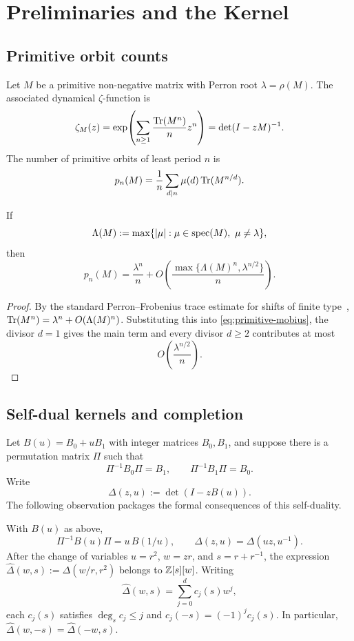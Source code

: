 \section{Preliminaries and the Kernel}\label{sec:preliminaries}


\subsection{Primitive orbit counts}

Let \(M\) be a primitive non-negative matrix with Perron root
\(\lambda=\rho(M)\). The associated dynamical \(\zeta\)-function is
\[
  \zeta_M(z)
  =\exp\!\left(\sum_{n\ge 1}\frac{\operatorname{Tr}(M^n)}{n}z^n\right)
  =\det(I-zM)^{-1}.
\]
The number of primitive orbits of least period \(n\) is
\begin{equation}\label{eq:primitive-mobius}
  p_n(M)=\frac{1}{n}\sum_{d\mid n}\mu(d)\operatorname{Tr}(M^{n/d}).
\end{equation}

\begin{lemma}\label{lem:primitive-orbit-asymptotic}
If
\[
  \Lambda(M):=\max\{|\mu|:\mu\in\spec(M),\ \mu\neq\lambda\},
\]
then
\[
  p_n(M)=\frac{\lambda^n}{n}
  +O\!\left(\frac{\max\{\Lambda(M)^n,\lambda^{n/2}\}}{n}\right).
\]
\end{lemma}

\begin{proof}
By the standard Perron--Frobenius trace estimate for shifts of finite
type~\cite{LindMarcus2021,Kitchens1998},
\(
  \operatorname{Tr}(M^n)=\lambda^n+O(\Lambda(M)^n)
\).
Substituting this into \eqref{eq:primitive-mobius}, the divisor \(d=1\)
gives the main term and every divisor \(d\ge 2\) contributes at most
\[
  O\!\left(\frac{\lambda^{n/2}}{n}\right).
\]
\end{proof}

\subsection{Self-dual kernels and completion}


Let \(B(u)=B_0+uB_1\) with integer matrices \(B_0,B_1\), and suppose there is a permutation matrix \(\Pi\) such that
\[
  \Pi^{-1}B_0\Pi=B_1,
  \qquad
  \Pi^{-1}B_1\Pi=B_0.
\]
Write
\[\Delta(z,u):=\det(I-zB(u)).\]
The following observation packages the formal consequences of this self-duality.

\begin{lemma}\label{lem:self-dual-compression}
With \(B(u)\) as above,
\[
  \Pi^{-1}B(u)\Pi=u\,B(1/u),
  \qquad
  \Delta(z,u)=\Delta(uz,u^{-1}).
\]
After the change of variables \(u=r^2\), \(w=zr\), and
\(s=r+r^{-1}\), the expression
\(\widehat\Delta(w,s):=\Delta(w/r,r^2)\) belongs to \(\mathbb{Z}[s][w]\).
Writing
\[
  \widehat\Delta(w,s)=\sum_{j=0}^d c_j(s)w^j,
\]
each \(c_j(s)\) satisfies \(\deg_s c_j\le j\) and
\(c_j(-s)=(-1)^j c_j(s)\). In particular,
\(\widehat\Delta(w,-s)=\widehat\Delta(-w,s)\).
\end{lemma}

